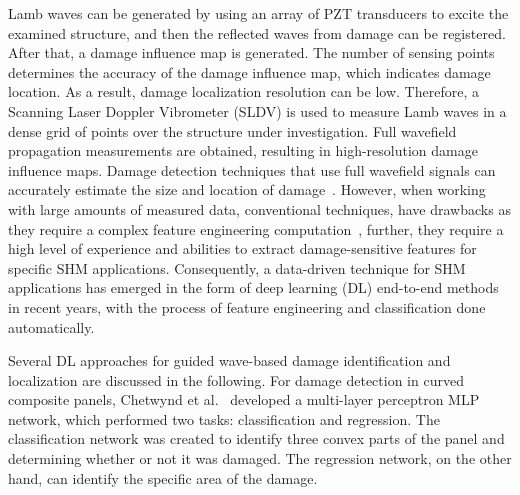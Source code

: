 \documentclass[runningheads]{llncs}
\begin{document}
Lamb waves can be generated by using an array of PZT transducers to excite the examined structure, and then the reflected waves from damage can be registered.
After that, a damage influence map is generated.
The number of sensing points determines the accuracy of the damage influence map, which indicates damage location.
As a result, damage localization resolution can be low.
Therefore, a Scanning Laser Doppler Vibrometer (SLDV) is used to measure Lamb waves in a dense grid of points over the structure under investigation.
Full wavefield propagation measurements are obtained, resulting in high-resolution damage influence maps.
Damage detection techniques that use full wavefield signals can accurately estimate the size and location of damage~\cite{Girolamo2018a}.
However, when working with large amounts of measured data, conventional techniques, have drawbacks as they require a complex feature engineering computation~\cite{Gulgec2019}, further, they require a high level of experience and abilities to extract damage-sensitive features for specific SHM applications.
Consequently, a data-driven technique for SHM applications has emerged in the form of deep learning (DL) end-to-end methods in recent years, with the process of feature engineering and classification done automatically.


Several DL approaches for guided wave-based damage identification and localization are discussed in the following.
For damage detection in curved composite panels, Chetwynd et al.~\cite{Chetwynd2008} developed a multi-layer perceptron MLP network,
which performed two tasks: classification and regression.
The classification network was created to identify three convex parts of the panel and determining whether or not it was damaged.
The regression network, on the other hand, can identify the specific area of the damage.
\end{document}
